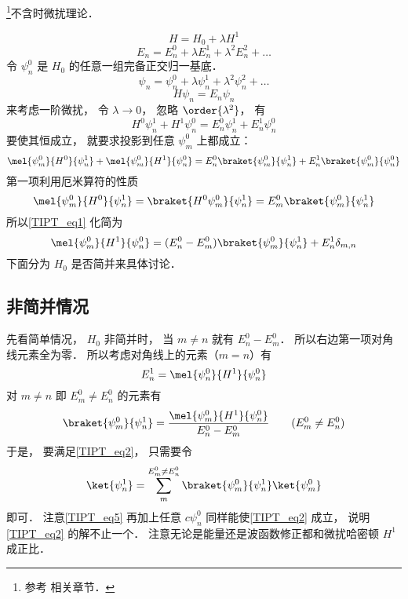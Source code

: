 
\begin{issues}
\issueDraft
\end{issues}

\footnote{参考 \cite{GriffQ} 相关章节．}不含时微扰理论．

\begin{equation}\label{TIPT_eq3}
H = H_0 + \lambda H^1
\end{equation}
\begin{equation}
E_n = E_n^0 + \lambda E_n^1 + \lambda^2 E_n^2 + \dots
\end{equation}
令 $\psi_n^0$ 是 $H_0$ 的任意一组完备正交归一基底．
\begin{equation}
\psi_n = \psi_n^0 + \lambda\psi_n^1 + \lambda^2 \psi_n^2 + \dots
\end{equation}
\begin{equation}
H \psi_n = E_n \psi_n
\end{equation}
来考虑一阶微扰， 令 $\lambda \to 0$， 忽略 $\order{\lambda^2}$， 有
\begin{equation}
H^0\psi_n^1 + H^1 \psi_n^0 = E_n^0 \psi_n^1 + E_n^1 \psi_n^0
\end{equation}
要使其恒成立， 就要求投影到任意 $\psi_m^0$ 上都成立：
\begin{equation}\label{TIPT_eq1}
\mel{\psi_m^0}{H^0}{\psi_n^1} + \mel{\psi_m^0}{H^1}{\psi_n^0} = E_n^0 \braket{\psi_m^0}{\psi_n^1} + E_n^1 \braket{\psi_m^0}{\psi_n^0}
\end{equation}
第一项利用厄米算符的性质
\begin{equation}
\mel{\psi_m^0}{H^0}{\psi_n^1} = \braket{H^0\psi_m^0}{\psi_n^1} = E_m^0\braket{\psi_m^0}{\psi_n^1}
\end{equation}
所以\autoref{TIPT_eq1} 化简为
\begin{equation}\label{TIPT_eq2}
\mel{\psi_m^0}{H^1}{\psi_n^0} = (E_n^0 - E_m^0) \braket{\psi_m^0}{\psi_n^1} + E_n^1 \delta_{m,n}
\end{equation}
下面分为 $H_0$ 是否简并来具体讨论．

\subsection{非简并情况}
先看简单情况， $H_0$ 非简并时， 当 $m\ne n$ 就有 $E_n^0 - E_m^0$． 所以右边第一项对角线元素全为零． 所以考虑对角线上的元素（$m = n$）有
\begin{equation}\label{TIPT_eq6}
E_n^1 = \mel{\psi_n^0}{H^1}{\psi_n^0}
\end{equation}
对 $m \ne n$ 即 $E_m^0 \ne E_n^0$ 的元素有
\begin{equation}\label{TIPT_eq4}
\braket{\psi_m^0}{\psi_n^1} = \frac{\mel{\psi_m^0}{H^1}{\psi_n^0}}{E_n^0 - E_m^0} \qquad (E_m^0 \ne E_n^0)
\end{equation}
于是， 要满足\autoref{TIPT_eq2}， 只需要令
\begin{equation}\label{TIPT_eq5}
\ket{\psi_n^1} = \sum_m^{E_m^0 \ne E_n^0} \braket{\psi_m^0}{\psi_n^1} \ket{\psi_m^0}
\end{equation}
即可． 注意\autoref{TIPT_eq5} 再加上任意 $c \psi_n^0$ 同样能使\autoref{TIPT_eq2} 成立， 说明\autoref{TIPT_eq2} 的解不止一个． 注意无论是能量还是波函数修正都和微扰哈密顿 $H^1$ 成正比．

